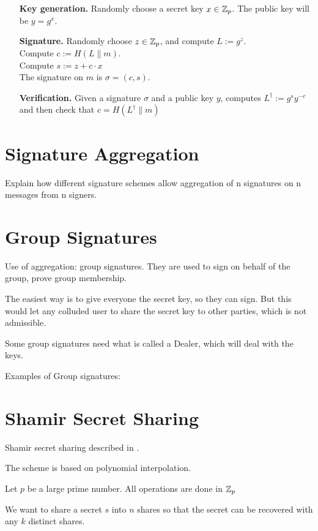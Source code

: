 \begin{itemize}[align = left, leftmargin=*]
	\item[\textbf{Key generation.}]	Randomly choose a secret key $x \in {\mathbb Z}_p$. The public key will be $y = g^x$.
	\item[\textbf{Signature.}] Randomly choose $z \in  {\mathbb Z}_p$, and compute $L := g^z$. \\
Compute $c := H(L \parallel m)$. \\
Compute $s := z + c \cdot x$ \\
The signature on $m$ is $\sigma = (c,s)$.
	\item[\textbf{Verification.}] Given a signature $\sigma$ and a public key $y$, computes $L^{\dagger} := g^{s} y^{-c}$ and then check that $c = H(L^{\dagger} \parallel m) $
\end{itemize}

\section{Signature Aggregation}
Explain how different signature schemes allow aggregation of n signatures on n messages from n signers.

\newpage
\section{Group Signatures}
Use of aggregation: group signatures. They are used to sign on behalf of the group, prove group membership.

The easiest way is to give everyone the secret key, so they can sign. But this would let any colluded user to share the secret key to other parties, which is not admissible.

Some group signatures need what is called a Dealer, which will deal with the keys.

Examples of Group signatures:

\section{Shamir Secret Sharing}
Shamir secret sharing described in \cite{Sham79}.

The scheme is based on polynomial interpolation.

Let $p$ be a large prime number. All operations are done in ${\mathbb Z}_p$

We want to share a secret $s$ into $n$ shares so that the secret can be recovered with any $k$ distinct shares.

